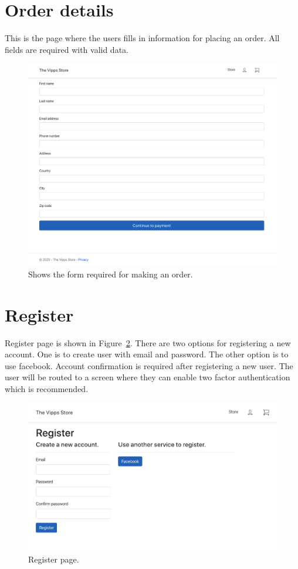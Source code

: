 \documentclass[11pt,a4paper,english]{article}
\begin{document}
\section*{Order details}
This is the page where the users fills in information for placing an order. All fields are required with valid data.
\begin{figure}[htbp]
  \centering
  \includegraphics[scale=0.2]{order}
  \caption{Shows the form required for making an order.}
  \label{fig:order}
\end{figure}
\section*{Register}
Register page is shown in Figure~\ref{fig:register}. There are two options for registering a new account. One is to create user with email and password. The other option is to use facebook. Account confirmation is required after registering a new user. The user will be routed to a screen where they can enable two factor authentication which is recommended.
\begin{figure}[htbp]
  \centering
  \includegraphics[scale=0.3]{register}
  \caption{Register page.}
  \label{fig:register}
\end{figure}
\end{document}
